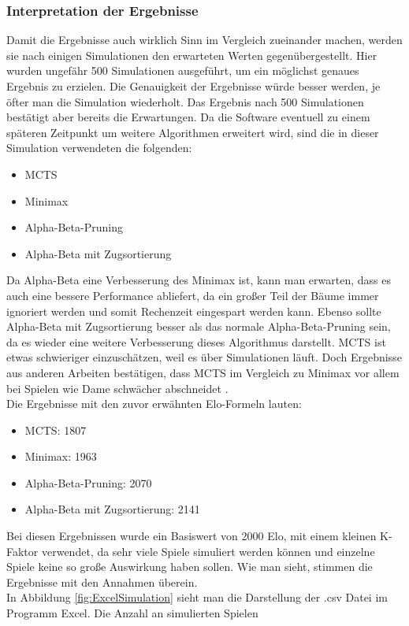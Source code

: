 \documentclass[12pt,a4paper,bibliography=totocnumbered,listof=totocnumbered]{article}
\begin{document}
\subsubsection{Interpretation der Ergebnisse}
Damit die Ergebnisse auch wirklich Sinn im Vergleich zueinander machen, werden sie nach einigen Simulationen den erwarteten Werten gegenübergestellt.
Hier wurden ungefähr 500 Simulationen ausgeführt, um ein möglichst genaues Ergebnis zu erzielen. Die Genauigkeit der Ergebnisse würde
besser werden, je öfter man die Simulation wiederholt. Das Ergebnis nach 500 Simulationen bestätigt aber bereits die Erwartungen.
Da die Software eventuell zu einem späteren Zeitpunkt um weitere Algorithmen erweitert wird, sind die in dieser Simulation verwendeten die folgenden:
\begin{itemize}
    \item \ac{MCTS}
    \item Minimax 
    \item Alpha-Beta-Pruning
    \item Alpha-Beta mit Zugsortierung 
\end{itemize}
Da Alpha-Beta eine Verbesserung des Minimax ist, kann man erwarten, dass es auch eine bessere Performance abliefert, da ein großer Teil der Bäume 
immer ignoriert werden und somit Rechenzeit eingespart werden kann. Ebenso sollte Alpha-Beta mit Zugsortierung besser als das normale 
Alpha-Beta-Pruning sein, da es wieder eine weitere Verbesserung dieses Algorithmus darstellt. \ac{MCTS} ist etwas schwieriger einzuschätzen, weil 
es über Simulationen läuft. Doch Ergebnisse aus anderen Arbeiten bestätigen, dass \ac{MCTS} im Vergleich zu Minimax vor allem bei Spielen wie Dame 
schwächer abschneidet \cite{MiniaxMCTScomparison}.
\\
Die Ergebnisse mit den zuvor erwähnten Elo-Formeln lauten:
\begin{itemize}
    \item \ac{MCTS}: 1807
    \item Minimax: 1963
    \item Alpha-Beta-Pruning: 2070
    \item Alpha-Beta mit Zugsortierung: 2141
\end{itemize}
Bei diesen Ergebnissen wurde ein Basiswert von 2000 Elo, mit einem kleinen K-Faktor verwendet, da sehr viele Spiele simuliert werden können und 
einzelne Spiele keine so große Auswirkung haben sollen. Wie man sieht, stimmen die Ergebnisse mit den Annahmen überein.
\\
In Abbildung \ref{fig:ExcelSimulation} sieht man die Darstellung der .csv Datei im Programm Excel. Die Anzahl an simulierten Spielen
\end{document}
